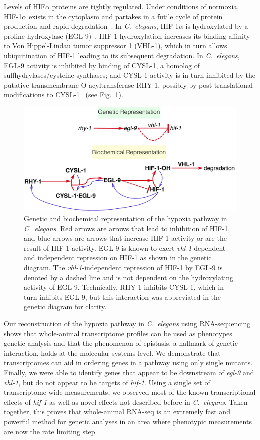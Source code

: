\documentclass[9pt,twocolumn,twoside,lineno]{pnas-new}
\newcommand{\cel}{\emph{C.~elegans}}
\newcommand{\gene}[1]{\mbox{\emph{#1}}}
\newcommand{\eglp}{EGL-9}
\newcommand{\rhyp}{RHY-1}
\newcommand{\vhlp}{VHL-1}
\newcommand{\hifp}{HIF-1}
\newcommand{\cyslp}{CYSL-1}
\begin{document}
Levels of HIF$\alpha$ proteins are tightly regulated. Under conditions of
normoxia, \hifp{}$\alpha$ exists in the cytoplasm and partakes in a futile cycle
of protein production and rapid degradation~\cite{Huang1996}. In \cel{},
\hifp{}$\alpha$ is hydroxylated by a proline hydroxylase
(\eglp{})~\cite{Kaelin2008}. \hifp{} hydroxylation increases its binding
affinity to Von Hippel-Lindau tumor suppressor 1 (\vhlp{}), which in turn allows
ubiquitination of \hifp{} leading to its subsequent degradation. In \cel{},
\eglp{} activity is inhibited by binding of \cyslp{}, a homolog of
sulfhydrylases/cysteine synthases; and \cyslp{} activity is in turn inhibited by
the putative transmembrane O-acyltransferase \rhyp{}, possibly by
post-translational modifications to \cyslp{}~\cite{Ma2012} (see
Fig.~\ref{fig:pathway}).

\begin{figure}[tbhp]
  \centering
  \includegraphics[width=\linewidth]{../figs/HIF1pathway.pdf}
  \caption{
    Genetic and biochemical representation of the hypoxia pathway in \cel{}. Red
    arrows are arrows that lead to inhibition of \hifp{}, and blue arrows are
    arrows that increase \hifp{} activity or are the result of \hifp{} activity.
    \eglp{} is known to exert \gene{vhl-1}-dependent and independent repression
    on \hifp{} as shown in the genetic diagram. The \gene{vhl-1}-independent
    repression of \hifp{} by \eglp{} is denoted by a dashed line and is not
    dependent on the hydroxylating activity of \eglp{}. Technically, RHY-1
    inhibits CYSL-1, which in turn inhibits EGL-9, but this interaction was
    abbreviated in the genetic diagram for clarity.
  }
\label{fig:pathway}
\end{figure}

Our reconstruction of the hypoxia pathway in \cel{} using RNA-sequencing shows
that whole-animal transcriptome profiles can be used as phenotypes genetic
analysis and that the phenomenon of epistasis, a hallmark of genetic
interaction, holds at the molecular systems level. We demonstrate that
transcriptomes can aid in ordering genes in a pathway using only single mutants.
Finally, we were able to identify genes that appear to be downstream of
\gene{egl-9} and \gene{vhl-1}, but do not appear to be targets of \gene{hif-1}.
Using a single set of transcriptome-wide measurements, we observed most of the
known transcriptional effects of \gene{hif-1} as well as novel effects not
described before in \cel{}. Taken together, this proves that whole-animal
RNA-seq is an extremely fast and powerful method for genetic analyses in an area
where phenotypic measurements are now the rate limiting step.
\end{document}
